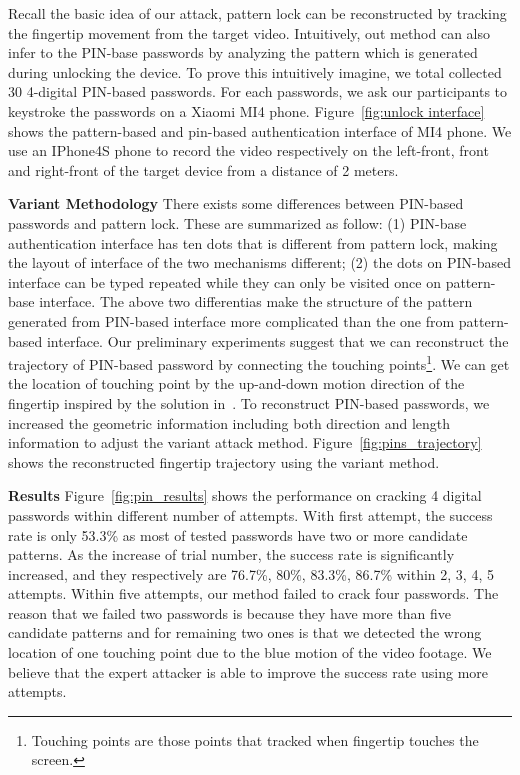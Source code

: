         Recall the basic idea of our attack, pattern lock can be reconstructed by tracking the fingertip movement  from the target video. Intuitively, out method can also infer to the PIN-base passwords by analyzing the pattern which is generated during unlocking the device. To prove this intuitively imagine, we total collected 30 4-digital PIN-based passwords. For each passwords, we ask our participants to keystroke the passwords on a Xiaomi MI4 phone. Figure~\ref{fig:unlock interface} shows the pattern-based and pin-based authentication interface of MI4 phone.  We use an IPhone4S phone to record the video respectively on the left-front, front and right-front of the target device from a distance of 2 meters.

        \noindent \textbf{Variant Methodology} There exists some differences between PIN-based passwords and pattern lock. These are summarized as follow: (1) PIN-base authentication interface has ten dots that is different from pattern lock, making the layout of interface of the two mechanisms different; (2) the dots on PIN-based interface can be typed repeated while they can only be visited once on pattern-base interface. The above two differentias make the structure of the pattern generated from PIN-based interface more complicated than the one from pattern-based interface. Our preliminary experiments suggest that we can reconstruct the trajectory of PIN-based password by connecting the touching points\footnote{Touching points are those points that tracked when fingertip touches the screen.}. We can get the location of touching point by the up-and-down motion direction of the fingertip inspired by the solution in~\cite{shukla2014beware}. To reconstruct PIN-based passwords, we increased the geometric information including both direction and length information to adjust the variant attack method. Figure~\ref{fig:pins_trajectory} shows the reconstructed fingertip trajectory using the variant method.

        \noindent \textbf{Results} Figure~\ref{fig:pin_results} shows the performance on cracking 4 digital passwords within different number of attempts. With first attempt, the success rate is only 53.3\% as most of tested passwords have two or more candidate patterns. As the increase of trial number, the success rate is significantly increased, and they respectively are 76.7\%, 80\%, 83.3\%, 86.7\% within 2, 3, 4, 5 attempts. Within five attempts, our method failed to crack four passwords. The reason that we failed two passwords is because they have more than five candidate patterns and for remaining two ones is that we detected the wrong location of one touching point due to the blue motion of the video footage. We believe that the expert attacker is able to improve the success rate using more attempts.



